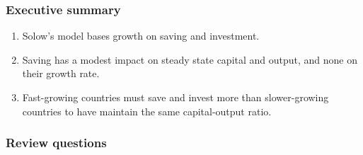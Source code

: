 \documentclass[letterpaper,12pt]{article}
\begin{document}




\subsubsection*{Executive summary}

\begin{enumerate}
\item Solow's model bases growth on saving and investment.

\item Saving has a modest impact on steady state capital and output, 
and none on their growth rate.

\item
Fast-growing countries must save and invest more than slower-growing countries
to have maintain the same capital-output ratio.
\end{enumerate}


\subsubsection*{Review questions}
\end{document}

